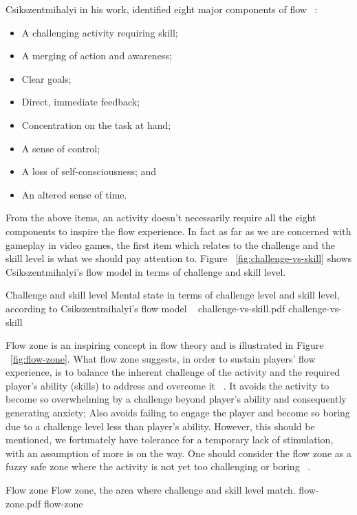 Csikszentmihalyi in his work, identified eight major components of flow ~\cite{csikszentmihalyi1990flow}:

\begin{itemize}
\item A challenging activity requiring skill;
\item A merging of action and awareness;
\item Clear goals;
\item Direct, immediate feedback;
\item Concentration on the task at hand; 
\item A sense of control;
\item A loss of self-consciousness; and
\item An altered sense of time. 
\end{itemize}

From the above items, an activity doesn't necessarily require all the eight components to inspire the flow experience. In fact as far as we are concerned with gameplay in video games, the first item which relates to the challenge and the skill level is what we should pay attention to. Figure ~\ref{fig:challenge-vs-skill} shows Csikszentmihalyi's flow model in terms of challenge and skill level.

\img
{Challenge and skill level}
{Mental state in terms of challenge level and skill level, according to Csikszentmihalyi's flow model ~\cite{csikszentmihalyi1997finding}}
{challenge-vs-skill.pdf}
{challenge-vs-skill}

Flow zone is an inspiring concept in flow theory and is illustrated in Figure ~\ref{fig:flow-zone}. What flow zone suggests, in order to sustain players' flow experience, is to balance the inherent challenge of the activity and the required player's ability (skills) to address and overcome it ~\cite{chen2007flow}. It avoids the activity to become so overwhelming by a challenge beyond player's ability and consequently generating anxiety; Also avoids failing to engage the player and become so boring due to a challenge level less than player's ability. However, this should be mentioned, we fortunately have tolerance for a temporary lack of stimulation, with an assumption of more is on the way. One should consider the flow zone as a fuzzy safe zone where the activity is not yet too challenging or boring ~\cite{csikszentmihalyi1990flow}.

\img
{Flow zone}
{Flow zone, the area where challenge and skill level match.}
{flow-zone.pdf}
{flow-zone}

